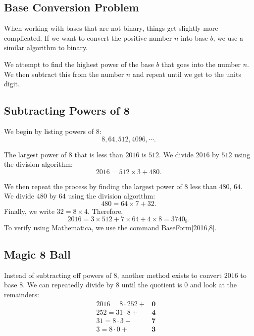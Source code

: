 \subsection{Base Conversion Problem}

When working with bases that are not binary, things get slightly more complicated. If we want to convert the positive number $n$ into base $b$, we use a similar algorithm to binary.  

We attempt to find the highest power of the base $b$ that goes into the number $n$. We then subtract this from the number $n$ and repeat until we get to the units digit. 


\clearpage

\subsection{Subtracting Powers of 8}

We begin by listing powers of $8$:  $$8, 64, 512, 4096, \cdots.$$  

The largest power of $8$ that is less than $2016$ is $512$. We divide $2016$ by $512$ using the division algorithm:
$$2016=512\times 3+480.$$  

\clearpage

We then repeat the process by finding the largest power of $8$ less than $480$, $64$. We divide $480$ by $64$ using the division algorithm: $$480=64\times 7+32.$$ 
Finally, we write $32=8\times 4$.  Therefore, $$2016=3\times 512+7\times 64+4\times 8=3740_8.$$ To verify using Mathematica, we use the command BaseForm[2016,8]. 

\clearpage  

\subsection{Magic 8 Ball}

Instead of subtracting off powers of $8$, another method exists to convert $2016$ to base $8$. We can repeatedly divide by $8$ until the quotient is $0$ and look at the remainders: \begin{eqnarray*}  2016=8\cdot 252+&\textbf{0}& \\ 252=31\cdot 8+&\textbf{4}& \\ 31=8\cdot 3+&\textbf{7}& \\ 3=8\cdot 0+&\textbf{3}& \end{eqnarray*}

